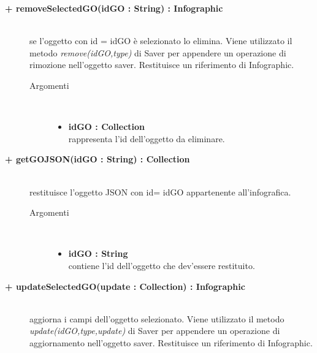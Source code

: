 \begin{description}
\begin{description}
\begin{description}
\end{description}

\end{description}


\begin{description}
		\item[\textbf{\color{blue}+ removeSelectedGO(idGO : String) : Infographic			}] \hfill \\
			se l'oggetto con id = idGO è selezionato lo elimina. Viene utilizzato il metodo \textit{remove(idGO,type)} di Saver per appendere un operazione di rimozione nell'oggetto saver. Restituisce un riferimento di Infographic.

\begin{description}
			\item[Argomenti] \hfill \\
				\begin{itemize}
						\item \textbf{idGO : Collection			} \hfill \\
					rappresenta l'id dell'oggetto da eliminare.
				\end{itemize}

\end{description}

\end{description}

\begin{description}
		\item[\textbf{\color{blue}+ getGOJSON(idGO : String) : Collection			}] \hfill \\
			restituisce l'oggetto JSON con id= idGO appartenente all'infografica.   

\begin{description}
			\item[Argomenti] \hfill \\
				\begin{itemize}
						\item \textbf{idGO : String			} \hfill \\
					contiene l'id dell'oggetto che dev'essere restituito.
				\end{itemize}

\end{description}

\end{description}

\begin{description}
		\item[\textbf{\color{blue}+ updateSelectedGO(update : Collection) : Infographic			}] \hfill \\
			aggiorna i campi dell'oggetto selezionato. Viene utilizzato il metodo \textit{update(idGO,type,update)} di Saver per appendere un operazione di aggiornamento nell'oggetto saver. Restituisce un riferimento di Infographic.  


\end{description}
\end{description}
